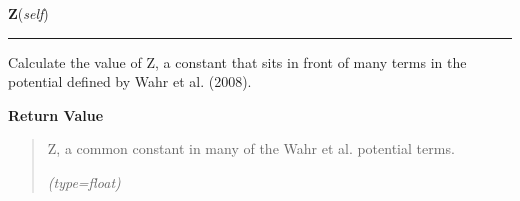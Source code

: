     \label{satstress:SatStress:StressDef:Z}

    \vspace{0.5ex}

\hspace{.8\funcindent}\begin{boxedminipage}{\funcwidth}

    \raggedright \textbf{Z}(\textit{self})

    \vspace{-1.5ex}

    \rule{\textwidth}{0.5\fboxrule}
\setlength{\parskip}{2ex}
    Calculate the value of Z, a constant that sits in front of many terms 
    in the potential defined by Wahr et al. (2008).

\setlength{\parskip}{1ex}
      \textbf{Return Value}
    \vspace{-1ex}

      \begin{quote}
      Z, a common constant in many of the Wahr et al. potential terms.

      {\it (type=float)}

      \end{quote}

    \end{boxedminipage}

    \label{satstress:SatStress:StressDef:mu_twiddle}

    \vspace{0.5ex}

